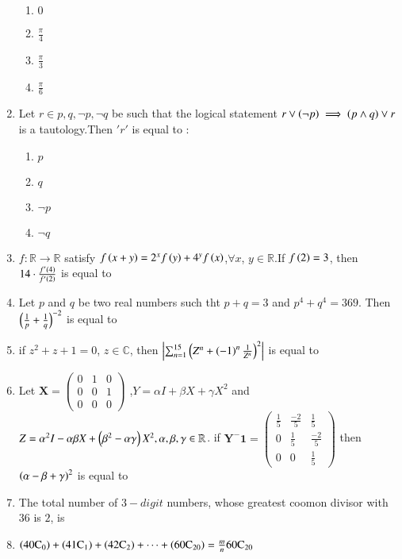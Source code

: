 \documentclass[journal,12pt,onecolumn]{IEEEtran}
\theoremstyle{remark}
\begin{document}
\begin{enumerate}
    \begin{enumerate}
        \item $0$
        \item $\frac{\pi}{4}$
        \item $\frac{\pi}{3}$
        \item $\frac{\pi}{6}$
    \end{enumerate}
    \item Let $r \in {p,q,\neg p,\neg q}$ be such that the logical statement $r\lor \left(\neg p\right)\implies\left(p\land q\right)\lor r$ is a tautology.Then $'r'$ is equal to :
    \begin{enumerate}
        \item $p$
        \item $q$
        \item $\neg p$
        \item $\neg q$
    \end{enumerate}
    \item $f: \mathbb{R} \to \mathbb{R}$ satisfy $f\left(x+y\right)=2^xf\left(y\right)+4^yf\left(x\right)$,$\forall x$,  $y \in \mathbb{R}$.If $f\left(2\right)=3$, then $14\cdot \frac{f^{\prime}\left(4\right)}{f^{\prime}\left(2\right)}$ is equal to 
    \item Let $p$ and $q$ be two real numbers such tht $p+q=3$
and $p^4+q^4=369$. Then $\left(\frac{1}{p}+\frac{1}{q}\right)^{-2}$ is equal to 
\item if $z^2+z+1=0$, $z \in \mathbb{C}$, then $\left\vert\sum_{n=1}^{15}\left(Z^n+{\left(-1\right)^n\frac{1}{Z^n}}\right)^2\right\vert$ is equal to 
\item Let $\mathbf{X} = \begin{pmatrix}
0 & 1 & 0 \\
0 & 0 & 1 \\
0 & 0 & 0
\end{pmatrix}$ ,$Y=\alpha I+\beta X+\gamma X^2$ and $Z={\alpha^2}I-\alpha \beta X+\left({\beta^2}-\alpha \gamma\right)X^2,\alpha ,\beta ,\gamma \in \mathbb{R}$. if $\mathbf{Y^-1} = \begin{pmatrix}
\frac{1}{5} & \frac{-2}{5} & \frac{1}{5} \\
0 & \frac{1}{5} & \frac{-2}{5} \\
0 & 0 & \frac{1}{5}
\end{pmatrix}$ then $\left(\alpha -\beta +\gamma\right)^2$ is equal to 
\item The total number of $3-digit$ numbers, whose greatest coomon divisor with $36$ is $2$, is 
\item $\left(\mathrm{40C_0}\right)+\left(\mathrm{41C_1}\right)+\left(\mathrm{42C_2}\right)+\cdots +\left(\mathrm{60C_{20}}\right)=\frac{m}{n}\mathrm{60C_{20}}$

\end{enumerate}
\end{document}
